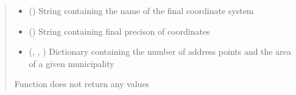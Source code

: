 \documentclass[letterpaper,10pt,english]{sphinxmanual}
\begin{document}
\begin{fulllineitems}
\begin{quote}
\begin{description}
\begin{itemize}
\item {} 
\sphinxAtStartPar
{} () \textendash{} String containing the name of the final coordinate system

\item {} 
\sphinxAtStartPar
{} () \textendash{} String containing final precison of coordinates

\item {} 
\sphinxAtStartPar
{} (\sphinxcode{\sphinxupquote{Dict}}{[}, \sphinxcode{\sphinxupquote{Dict}}{[}, \sphinxcode{\sphinxupquote{Any}}{]}{]}) \textendash{} Dictionary containing the number of address points and the area of a given municipality

\end{itemize}

\sphinxAtStartPar
{}

\sphinxAtStartPar
Function does not return any values

\end{description}\end{quote}

\end{fulllineitems}

\end{document}

